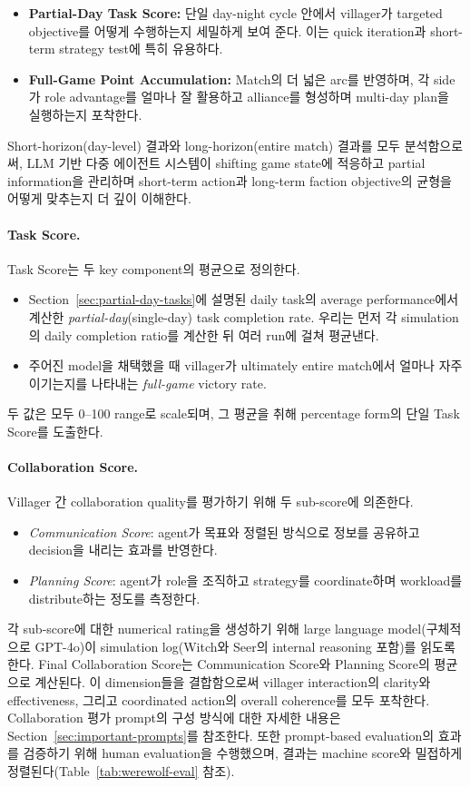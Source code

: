 \begin{itemize}
    \item \textbf{Partial-Day Task Score:} 단일 day-night cycle 안에서 villager가 targeted objective를 어떻게 수행하는지 세밀하게 보여 준다. 이는 quick iteration과 short-term strategy test에 특히 유용하다.
    \item \textbf{Full-Game Point Accumulation:} Match의 더 넓은 arc를 반영하며, 각 side가 role advantage를 얼마나 잘 활용하고 alliance를 형성하며 multi-day plan을 실행하는지 포착한다.
\end{itemize}

Short-horizon(day-level) 결과와 long-horizon(entire match) 결과를 모두 분석함으로써, LLM 기반 다중 에이전트 시스템이 shifting game state에 적응하고 partial information을 관리하며 short-term action과 long-term faction objective의 균형을 어떻게 맞추는지 더 깊이 이해한다.

\paragraph{Task Score.}
Task Score는 두 key component의 평균으로 정의한다.
\begin{itemize}
    \item Section~\ref{sec:partial-day-tasks}에 설명된 daily task의 average performance에서 계산한 \emph{partial-day}(single-day) task completion rate. 우리는 먼저 각 simulation의 daily completion ratio를 계산한 뒤 여러 run에 걸쳐 평균낸다.
    \item 주어진 model을 채택했을 때 villager가 ultimately entire match에서 얼마나 자주 이기는지를 나타내는 \emph{full-game} victory rate.
\end{itemize}
두 값은 모두 0--100 range로 scale되며, 그 평균을 취해 percentage form의 단일 Task Score를 도출한다.

\paragraph{Collaboration Score.}
Villager 간 collaboration quality를 평가하기 위해 두 sub-score에 의존한다.
\begin{itemize}
    \item \emph{Communication Score}: agent가 목표와 정렬된 방식으로 정보를 공유하고 decision을 내리는 효과를 반영한다.
    \item \emph{Planning Score}: agent가 role을 조직하고 strategy를 coordinate하며 workload를 distribute하는 정도를 측정한다.
\end{itemize}
각 sub-score에 대한 numerical rating을 생성하기 위해 large language model(구체적으로 GPT-4o)이 simulation log(Witch와 Seer의 internal reasoning 포함)를 읽도록 한다. Final Collaboration Score는 Communication Score와 Planning Score의 평균으로 계산된다. 이 dimension들을 결합함으로써 villager interaction의 clarity와 effectiveness, 그리고 coordinated action의 overall coherence를 모두 포착한다. Collaboration 평가 prompt의 구성 방식에 대한 자세한 내용은 Section~\ref{sec:important-prompts}를 참조한다. 또한 prompt-based evaluation의 효과를 검증하기 위해 human evaluation을 수행했으며, 결과는 machine score와 밀접하게 정렬된다(Table~\ref{tab:werewolf-eval} 참조).

